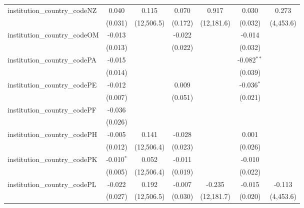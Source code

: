 \begin{tabular}{lcccccc}
   institution\_country\_codeNZ          & 0.040          & 0.115         & 0.070         & 0.917         & 0.030         & 0.273\\   
                                         & (0.031)        & (12,506.5)    & (0.172)       & (12,181.6)    & (0.032)       & (4,453.6)\\   
   institution\_country\_codeOM          & -0.013         &               & -0.022        &               & -0.014        &   \\   
                                         & (0.013)        &               & (0.022)       &               & (0.032)       &   \\   
   institution\_country\_codePA          & -0.015         &               &               &               & -0.082$^{**}$ &   \\   
                                         & (0.014)        &               &               &               & (0.039)       &   \\   
   institution\_country\_codePE          & -0.012         &               & 0.009         &               & -0.036$^{*}$  &   \\   
                                         & (0.007)        &               & (0.051)       &               & (0.021)       &   \\   
   institution\_country\_codePF          & -0.036         &               &               &               &               &   \\   
                                         & (0.026)        &               &               &               &               &   \\   
   institution\_country\_codePH          & -0.005         & 0.141         & -0.028        &               & 0.001         &   \\   
                                         & (0.012)        & (12,506.4)    & (0.023)       &               & (0.026)       &   \\   
   institution\_country\_codePK          & -0.010$^{*}$   & 0.052         & -0.011        &               & -0.010        &   \\   
                                         & (0.005)        & (12,506.4)    & (0.019)       &               & (0.022)       &   \\   
   institution\_country\_codePL          & -0.022         & 0.192         & -0.007        & -0.235        & -0.015        & -0.113\\   
                                         & (0.027)        & (12,506.5)    & (0.030)       & (12,181.7)    & (0.020)       & (4,453.6)\\   

\end{tabular}
